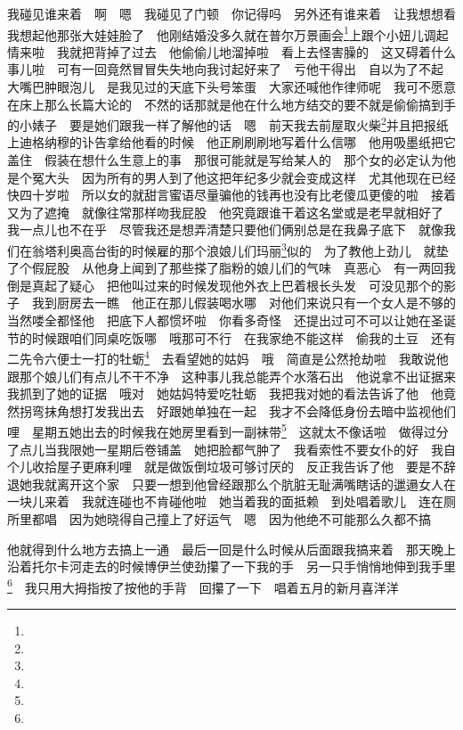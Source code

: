 \par 我碰见谁来着　啊　嗯　我碰见了门顿　你记得吗　另外还有谁来着　让我想想看　我想起他那张大娃娃脸了　他刚结婚没多久就在普尔万景画会\footnote{}上跟个小妞儿调起情来啦　我就把背掉了过去　他偷偷儿地溜掉啦　看上去怪害臊的　这又碍着什么事儿啦　可有一回竟然冒冒失失地向我讨起好来了　亏他干得出　自以为了不起　大嘴巴肿眼泡儿　是我见过的天底下头号笨蛋　大家还喊他作律师呢　我可不愿意在床上那么长篇大论的　不然的话那就是他在什么地方结交的要不就是偷偷搞到手的小婊子　要是她们跟我一样了解他的话　嗯　前天我去前屋取火柴\footnote{}并且把报纸上迪格纳穆的讣告拿给他看的时候　他正刷刷刷地写着什么信哪　他用吸墨纸把它盖住　假装在想什么生意上的事　那很可能就是写给某人的　那个女的必定认为他是个冤大头　因为所有的男人到了他这把年纪多少就会变成这样　尤其他现在已经快四十岁啦　所以女的就甜言蜜语尽量骗他的钱再也没有比老傻瓜更傻的啦　接着又为了遮掩　就像往常那样吻我屁股　他究竟跟谁干着这名堂或是老早就相好了　我一点儿也不在乎　尽管我还是想弄清楚只要他们俩别总是在我鼻子底下　就像我们在翁塔利奥高台街的时候雇的那个浪娘儿们玛丽\footnote{}似的　为了教他上劲儿　就垫了个假屁股　从他身上闻到了那些搽了脂粉的娘儿们的气味　真恶心　有一两回我倒是真起了疑心　把他叫过来的时候发现他外衣上巴着根长头发　可没见那个的影子　我到厨房去一瞧　他正在那儿假装喝水哪　对他们来说只有一个女人是不够的　当然喽全都怪他　把底下人都惯坏啦　你看多奇怪　还提出过可不可以让她在圣诞节的时候跟咱们同桌吃饭哪　哦那可不行　在我家绝不能这样　偷我的土豆　还有二先令六便士一打的牡蛎\footnote{}　去看望她的姑妈　哦　简直是公然抢劫啦　我敢说他跟那个娘儿们有点儿不干不净　这种事儿我总能弄个水落石出　他说拿不出证据来　我抓到了她的证据　哦对　她姑妈特爱吃牡蛎　我把我对她的看法告诉了他　他竟然拐弯抹角想打发我出去　好跟她单独在一起　我才不会降低身份去暗中监视他们哩　星期五她出去的时候我在她房里看到一副袜带\footnote{}　这就太不像话啦　做得过分了点儿当我限她一星期后卷铺盖　她把脸都气肿了　我看索性不要女仆的好　我自个儿收拾屋子更麻利哩　就是做饭倒垃圾可够讨厌的　反正我告诉了他　要是不辞退她我就离开这个家　只要一想到他曾经跟那么个肮脏无耻满嘴瞎话的邋遢女人在一块儿来着　我就连碰也不肯碰他啦　她当着我的面抵赖　到处唱着歌儿　连在厕所里都唱　因为她晓得自己撞上了好运气　嗯　因为他绝不可能那么久都不搞　
\par 他就得到什么地方去搞上一通　最后一回是什么时候从后面跟我搞来着　那天晚上沿着托尔卡河走去的时候博伊兰使劲攥了一下我的手　另一只手悄悄地伸到我手里\footnote{}　我只用大拇指按了按他的手背　回攥了一下　唱着五月的新月喜洋洋　
